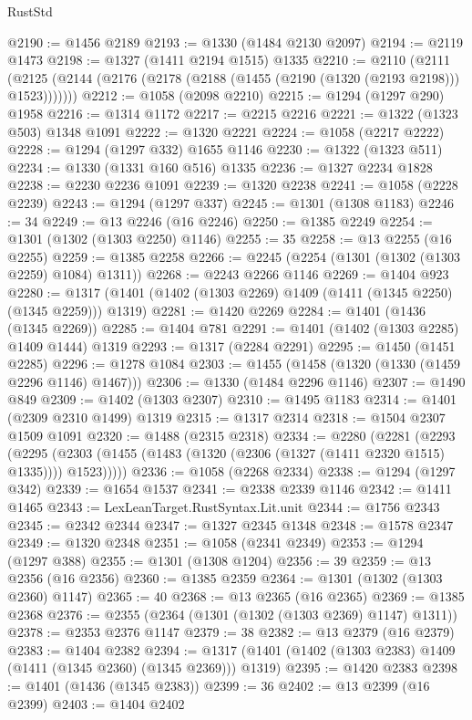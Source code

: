 \begin{lexlean}{RustStd}
\begin{coremodule}
{\begin{coremodule}
{{{{{{{{{{{{{{{{{{{{{{{{{{{{{{{{{{{{{{@2190 := @1456 @2189
@2193 := @1330 (@1484 @2130 @2097)
@2194 := @2119 @1473
@2198 := @1327 (@1411 @2194 @1515) @1335
@2210 := @2110
    (@2111 (@2125 (@2144 (@2176 (@2178 (@2188 (@1455 (@2190 (@1320 (@2193 @2198))) @1523)))))))
@2212 := @1058 (@2098 @2210)
@2215 := @1294 (@1297 @290) @1958
@2216 := @1314 @1172
@2217 := @2215 @2216
@2221 := @1322 (@1323 @503) @1348 @1091
@2222 := @1320 @2221
@2224 := @1058 (@2217 @2222)
@2228 := @1294 (@1297 @332) @1655 @1146
@2230 := @1322 (@1323 @511)
@2234 := @1330 (@1331 @160 @516) @1335
@2236 := @1327 @2234 @1828
@2238 := @2230 @2236 @1091
@2239 := @1320 @2238
@2241 := @1058 (@2228 @2239)
@2243 := @1294 (@1297 @337)
@2245 := @1301 (@1308 @1183)
@2246 := 34
@2249 := @13 @2246 (@16 @2246)
@2250 := @1385 @2249
@2254 := @1301 (@1302 (@1303 @2250) @1146)
@2255 := 35
@2258 := @13 @2255 (@16 @2255)
@2259 := @1385 @2258
@2266 := @2245 (@2254 (@1301 (@1302 (@1303 @2259) @1084) @1311))
@2268 := @2243 @2266 @1146
@2269 := @1404 @923
@2280 := @1317 (@1401 (@1402 (@1303 @2269) @1409 (@1411 (@1345 @2250) (@1345 @2259))) @1319)
@2281 := @1420 @2269
@2284 := @1401 (@1436 (@1345 @2269))
@2285 := @1404 @781
@2291 := @1401 (@1402 (@1303 @2285) @1409 @1444) @1319
@2293 := @1317 (@2284 @2291)
@2295 := @1450 (@1451 @2285)
@2296 := @1278 @1084
@2303 := @1455 (@1458 (@1320 (@1330 (@1459 @2296 @1146) @1467)))
@2306 := @1330 (@1484 @2296 @1146)
@2307 := @1490 @849
@2309 := @1402 (@1303 @2307)
@2310 := @1495 @1183
@2314 := @1401 (@2309 @2310 @1499) @1319
@2315 := @1317 @2314
@2318 := @1504 @2307 @1509 @1091
@2320 := @1488 (@2315 @2318)
@2334 := @2280
    (@2281
      (@2293
        (@2295 (@2303 (@1455 (@1483 (@1320 (@2306 (@1327 (@1411 @2320 @1515) @1335)))) @1523)))))
@2336 := @1058 (@2268 @2334)
@2338 := @1294 (@1297 @342)
@2339 := @1654 @1537
@2341 := @2338 @2339 @1146
@2342 := @1411 @1465
@2343 := LexLeanTarget.RustSyntax.Lit.unit
@2344 := @1756 @2343
@2345 := @2342 @2344
@2347 := @1327 @2345 @1348
@2348 := @1578 @2347
@2349 := @1320 @2348
@2351 := @1058 (@2341 @2349)
@2353 := @1294 (@1297 @388)
@2355 := @1301 (@1308 @1204)
@2356 := 39
@2359 := @13 @2356 (@16 @2356)
@2360 := @1385 @2359
@2364 := @1301 (@1302 (@1303 @2360) @1147)
@2365 := 40
@2368 := @13 @2365 (@16 @2365)
@2369 := @1385 @2368
@2376 := @2355 (@2364 (@1301 (@1302 (@1303 @2369) @1147) @1311))
@2378 := @2353 @2376 @1147
@2379 := 38
@2382 := @13 @2379 (@16 @2379)
@2383 := @1404 @2382
@2394 := @1317 (@1401 (@1402 (@1303 @2383) @1409 (@1411 (@1345 @2360) (@1345 @2369))) @1319)
@2395 := @1420 @2383
@2398 := @1401 (@1436 (@1345 @2383))
@2399 := 36
@2402 := @13 @2399 (@16 @2399)
@2403 := @1404 @2402
}}}}}}}}}}}}}}}}}}}}}}}}}}}}}}}}}}}}}}
\end{coremodule}}
\end{coremodule}
\end{lexlean}
